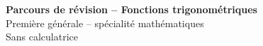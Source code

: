 \documentclass[11pt,a4paper]{article}
\newcommand{\tagcol}[2]{\begin{tcolorbox}[enhanced,colback=#1!11,colframe=#1!45!black,boxrule=0.42pt,arc=2mm,left=1mm,right=1mm,top=0.45mm,bottom=0.45mm,before skip=0mm,after skip=0.85mm,fontupper=\bfseries\scriptsize,colupper=#1!55!black]\centering #2\end{tcolorbox}}
\newcommand{\titrepage}{\begin{tcolorbox}[colback=white,colframe=bleu!70!black,boxrule=0.65pt,arc=3mm,left=2.5mm,right=2.5mm,top=1.15mm,bottom=1.15mm,before skip=0mm,after skip=1.4mm,drop fuzzy shadow=black!10]
{\Large\bfseries Parcours de révision -- Fonctions trigonométriques}\hfill {\normalsize Première spécialité -- sans calculatrice}
\end{tcolorbox}}
\begin{document}
\begin{center}
{\LARGE\bfseries Parcours de révision -- Fonctions trigonométriques}\\[1mm]
{\large Première générale -- spécialité mathématiques}\\[1mm]
{\normalsize Sans calculatrice}
\end{center}
\tableofcontents\newpage

\newcommand{\ficheRecap}{%
\begin{landscape}
\pagecolor{fondpage}
\thispagestyle{empty}
\titrepage
\begin{tabularx}{\linewidth}{@{}X@{\hspace{1.8mm}}X@{\hspace{1.8mm}}X@{\hspace{1.8mm}}X@{}}
\begin{panel}{}
\tagcol{bleu}{Cercle et radian}
\begin{fichebox}{bleu}{Cercle trigonométrique}
Cercle de centre $O$, de rayon $1$, orienté dans le sens direct.


\end{fichebox}
\end{panel}
\end{tabularx}
\end{landscape}}
\end{document}
